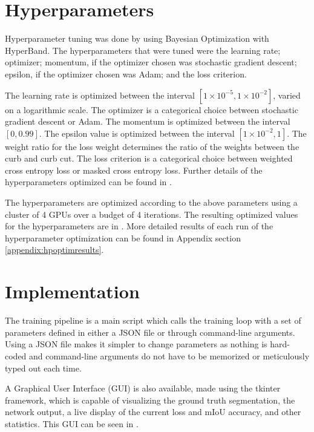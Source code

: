 

\section{Hyperparameters} \label{section:experiments-hyperparameters}
Hyperparameter tuning was done by using Bayesian Optimization with HyperBand.
The hyperparameters that were tuned were the learning rate; optimizer; momentum, if the optimizer chosen was stochastic gradient descent; epsilon, if the optimizer chosen was Adam; and the loss criterion.

The learning rate is optimized between the interval $\left[1 \times 10^{-5}, 1 \times 10^{-2}\right]$, varied on a logarithmic scale.
The optimizer is a categorical choice between stochastic gradient descent or Adam.
The momentum is optimized between the interval $\left[0, 0.99\right]$.
The epsilon value is optimized between the interval $\left[1 \times 10^{-2}, 1\right]$.
The weight ratio for the loss weight determines the ratio of the weights between the curb and curb cut.
The loss criterion is a categorical choice between weighted cross entropy loss or masked cross entropy loss.
Further details of the hyperparameters optimized can be found in .



The hyperparameters are optimized according to the above parameters using a cluster of 4 GPUs over a budget of 4 iterations.
The resulting optimized values for the hyperparameters are in .
More detailed results of each run of the hyperparameter optimization can be found in Appendix section \ref{appendix:hpoptimresults}.



\section{Implementation} \label{section:experiments-trainingpipeline}
The training pipeline is a main script which calls the training loop with a set of parameters defined in either a JSON file or through command-line arguments.
Using a JSON file makes it simpler to change parameters as nothing is hard-coded and command-line arguments do not have to be memorized or meticulously typed out each time.

A Graphical User Interface (GUI) is also available, made using the tkinter framework, which is capable of visualizing the ground truth segmentation, the network output, a live display of the current loss and mIoU accuracy, and other statistics.
This GUI can be seen in .

